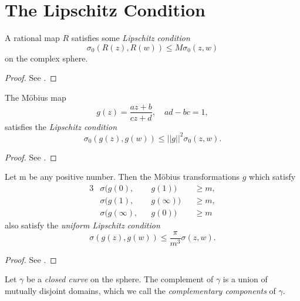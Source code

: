 \section{The Lipschitz Condition}

\begin{theorem}
    A rational map $R$ satisfies some \emph{Lipschitz condition}
    \[
        \sigma_0(R(z), R(w)) \leq M\sigma_0(z,w)
    \]
    on the complex sphere.
\end{theorem}
\begin{proof}
    See \cite[33]{Beardon1991}.
\end{proof}

\begin{theorem}
    The Möbius map
    \[
        g(z) = \frac{az + b}{cz+d},\quad ad-bc = 1,
    \]
    satisfies the \emph{Lipschitz condition}
    \[
        \sigma_0(g(z), g(w)) \leq ||g||^2 \sigma_0(z, w).
    \]
\end{theorem}
\begin{proof}
    See \cite[33-34]{Beardon1991}.
\end{proof}

\begin{theorem}
    Let m be any positive number. Then the Möbius transformations $g$ which
    satisfy
    \begin{alignat*}{3}
        &\sigma(g(0),      &&g(1))      &&\geq m, \\
        &\sigma(g(1),      &&g(\infty)) &&\geq m, \\
        &\sigma(g(\infty), &&g(0))      &&\geq m
    \end{alignat*}
    also satisfy the \emph{uniform Lipschitz condition}
    \[
        \sigma(g(z), g(w)) \leq \frac{\pi}{m^3} \sigma(z, w).
    \]
\end{theorem}
\begin{proof}
    See \cite[34-35]{Beardon1991}.
\end{proof}

\begin{definition}
    Let $\gamma$ be a \emph{closed curve} on the sphere. The complement of
    $\gamma$ is a union of mutually disjoint domains, which we call the
    \emph{complementary components} of $\gamma$.
\end{definition}

